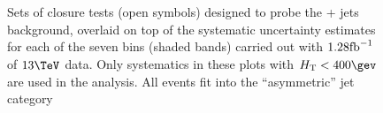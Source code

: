 \begin{figure}[h!]
  \begin{center}
     ~~
     \\
     ~~
     \\
    \caption{Sets of closure tests (open symbols) designed to probe
      the \znunu + jets background, overlaid on top of
      the systematic uncertainty estimates for each of the seven
      \scalht bins (shaded bands) carried out with $1.28\text{fb}^{-1}$ of
      $13\tev$ data. Only systematics in these plots with
      $\scalht<400\gev$ are used in the analysis. All events fit 
      into the ``asymmetric'' jet
      category}
    \label{fig:ZinvclosureDataSymlt400}
  \end{center} 
\end{figure}

